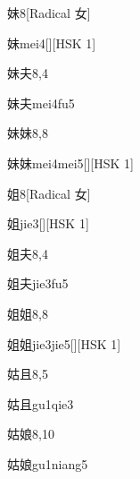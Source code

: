 \begin{entry}{妹}{8}[Radical 女]
  \begin{phonetics}{妹}{mei4}[][HSK 1]
  \end{phonetics}
\end{entry}

\begin{entry}{妹夫}{8,4}
  \begin{phonetics}{妹夫}{mei4fu5}
  \end{phonetics}
\end{entry}

\begin{entry}{妹妹}{8,8}
  \begin{phonetics}{妹妹}{mei4mei5}[][HSK 1]
  \end{phonetics}
\end{entry}

\begin{entry}{姐}{8}[Radical 女]
  \begin{phonetics}{姐}{jie3}[][HSK 1]
  \end{phonetics}
\end{entry}

\begin{entry}{姐夫}{8,4}
  \begin{phonetics}{姐夫}{jie3fu5}
  \end{phonetics}
\end{entry}

\begin{entry}{姐姐}{8,8}
  \begin{phonetics}{姐姐}{jie3jie5}[][HSK 1]
  \end{phonetics}
\end{entry}

\begin{entry}{姑且}{8,5}
  \begin{phonetics}{姑且}{gu1qie3}
  \end{phonetics}
\end{entry}

\begin{entry}{姑娘}{8,10}
  \begin{phonetics}{姑娘}{gu1niang5}
  \end{phonetics}
\end{entry}

